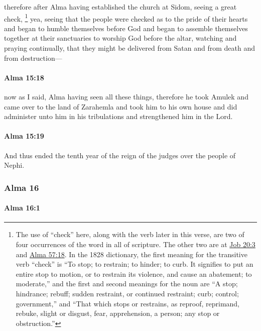 			therefore after Alma having established the church at Sidom,
			seeing a great check,%
				\footnote{%
					The use of ``check'' here, along with the verb later in this verse, are two of four occurrences of the word in all of scripture. The other two are at \hyperref[JOB-20-3]{Job 20:3} and \hyperref[ALMA-57-18]{Alma 57:18}. In the 1828 dictionary, the first meaning for the transitive verb ``check'' is ``To stop; to restrain; to hinder; to curb. It signifies to put an entire stop to motion, or to restrain its violence, and cause an abatement; to moderate,'' and the first and second meanings for the noun are ``A stop; hindrance; rebuff; sudden restraint, or continued restraint; curb; control; government,'' and ``That which stops or restrains, as reproof, reprimand, rebuke, slight or disgust, fear, apprehension, a person; any stop or obstruction.''
					}
			yea, seeing that the people were checked as to the pride of their hearts
			and began to humble themselves before God
			and began to assemble themselves together at their sanctuaries
			to worship God before the altar,
			watching and praying continually,
			that they might be delivered from Satan and from death and from destruction---

		\paragraph{Alma 15:18} %
			\label{ALMA-15-18}

			now as I said,
			Alma having seen all these things,
			therefore he took Amulek and came over to the land of Zarahemla
			and took him to his own house
			and did administer unto him in his tribulations
			and strengthened him in the Lord.

		\paragraph{Alma 15:19} %
			\label{ALMA-15-19}

			And thus ended the tenth year
			of the reign of the judges over the people of Nephi.

	\subsubsection{Alma 16} %
		\label{ALMA-16}
		
		\paragraph{Alma 16:1} %
			\label{ALMA-16-1}

